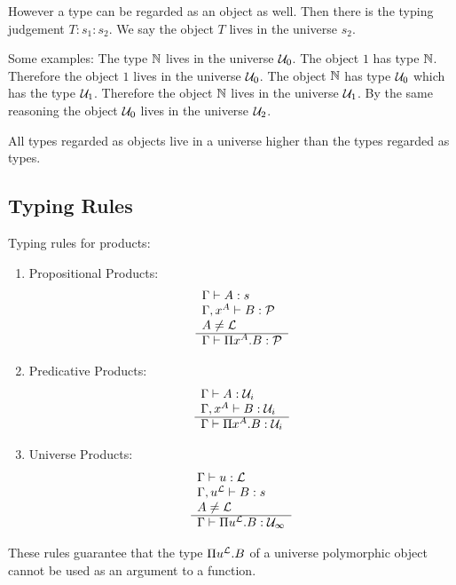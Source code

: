 However a type can be regarded as an object as well. Then there is the typing
judgement $T: s_1 : s_2$. We say the object $T$ lives in the universe $s_2$.

Some examples: The type ${\mathbb N}$ lives in the universe ${\mathcal U}_0$. The object $1$
has type ${\mathbb N}$. Therefore the object $1$ lives in the universe ${\mathcal U}_0$. The
object ${\mathbb N}$ has type ${\mathcal U}_0$ which has the type ${\mathcal U}_1$. Therefore the
object ${\mathbb N}$ lives in the universe ${\mathcal U}_1$. By the same reasoning the object
${\mathcal U}_0$ lives in the universe ${\mathcal U}_2$.

All types regarded as objects live in a universe higher than the types regarded
as types.




\subsection{Typing Rules}


Typing rules for products:
\begin{enumerate}
    \item Propositional Products:
        $$
            \begin{array}{l} 
                \Gamma \vdash A: s
                \\
                \Gamma, x^A \vdash B: {\mathcal P}
                \\
                A \ne {\mathcal L}
             \\ \hline 
                \Gamma \vdash \Pi x^A. B : {\mathcal P}
             \end{array}
        $$
    \item Predicative Products:
        $$
            \begin{array}{l} 
                \Gamma \vdash A: {\mathcal U}_i
                \\
                \Gamma, x^A \vdash B: {\mathcal U}_i
             \\ \hline 
                \Gamma \vdash \Pi x^A. B : {\mathcal U}_i
             \end{array}
        $$

    \item Universe Products:
        $$
            \begin{array}{l} 
                \Gamma \vdash u: {\mathcal L}
                \\
                \Gamma, u^{\mathcal L} \vdash B: s
                \\
                A \ne {\mathcal L}
             \\ \hline 
                \Gamma \vdash \Pi u^{\mathcal L}. B : {\mathcal U}_\infty
             \end{array}
        $$
\end{enumerate}
These rules guarantee that the type $\Pi u^{\mathcal L}. B$ of a universe polymorphic
object cannot be used as an argument to a function.


